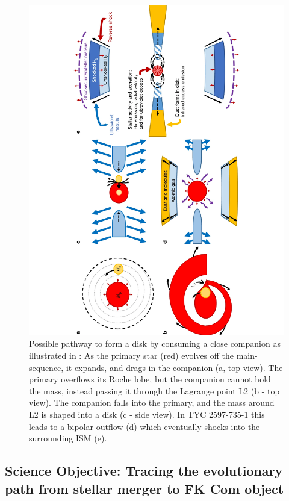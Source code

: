 \documentclass[letterpaper,11pt]{article}
\begin{document}
\begin{figure}[htbp]
\begin{center}

\includegraphics[angle=-90,width=.8\textwidth]{nature_sketch}
\caption{Possible pathway to form a disk by consuming a close companion as illustrated in \cite{2020Natur.587..387H}: As the primary star (red) evolves off the main-sequence, it expands, and drags in the companion (a, top view). The primary overflows its Roche lobe, but the companion cannot hold the mass, instead passing it through the Lagrange point L2 (b - top view). The companion falls into the primary, and the mass around L2 is shaped into a disk (c - side view). In TYC 2597-735-1 this leads to a bipolar outflow (d) which eventually shocks into the surrounding ISM (e).}
\label{fig:naturesketch}
\end{center}
\end{figure}





\subsection*{Science Objective: Tracing the evolutionary path from stellar merger to FK Com object}
\end{document}
